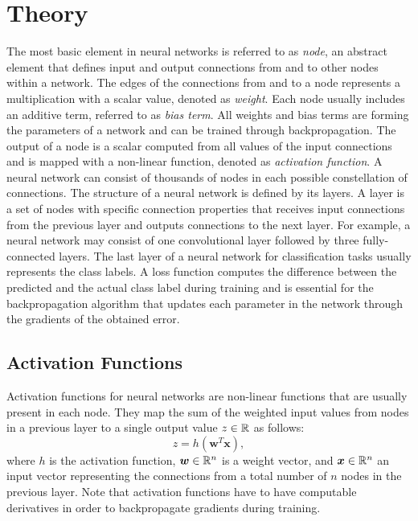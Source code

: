 
\section{Theory}\label{sec:nn_theory}
The most basic element in neural networks is referred to as \emph{node}, an abstract element that defines input and output connections from and to other nodes within a network.
The edges of the connections from and to a node represents a multiplication with a scalar value, denoted as \emph{weight}.
Each node usually includes an additive term, referred to as \emph{bias term}.
All weights and bias terms are forming the parameters of a network and can be trained through backpropagation.
The output of a node is a scalar computed from all values of the input connections and is mapped with a non-linear function, denoted as \emph{activation function}.
A neural network can consist of thousands of nodes in each possible constellation of connections.
The structure of a neural network is defined by its layers.
A layer is a set of nodes with specific connection properties that receives input connections from the previous layer and outputs connections to the next layer.
For example, a neural network may consist of one convolutional layer followed by three fully-connected layers.
The last layer of a neural network for classification tasks usually represents the class labels.
A loss function computes the difference between the predicted and the actual class label during training and is essential for the backpropagation algorithm that updates each parameter in the network through the gradients of the obtained error.



\subsection{Activation Functions}\label{sec:nn_theory_acti}
Activation functions for neural networks are non-linear functions that are usually present in each node.
They map the sum of the weighted input values from nodes in a previous layer to a single output value $z \in \mathbb{R}$ as follows:
\begin{equation}\label{eq:nn_theory_acti}
  z = h(\bm{w}^T \bm{x}),
\end{equation}
where $h$ is the activation function, $\bm{w} \in \mathbb{R}^n$ is a weight vector, and $\bm{x} \in \mathbb{R}^n$ an input vector representing the connections from a total number of $n$ nodes in the previous layer.
Note that activation functions have to have computable derivatives in order to backpropagate gradients during training.

